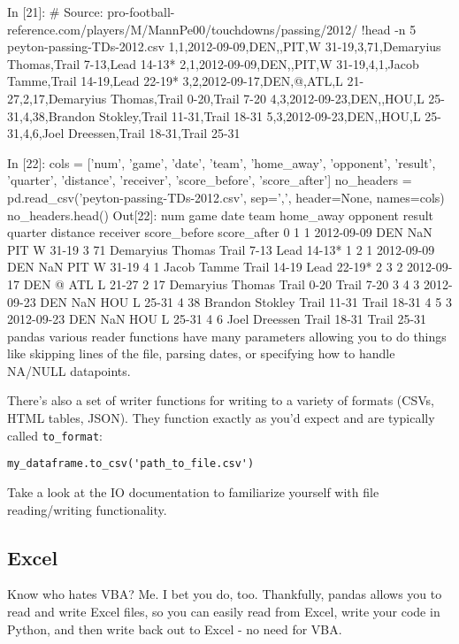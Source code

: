 In [21]:
# Source: pro-football-reference.com/players/M/MannPe00/touchdowns/passing/2012/
!head -n 5 peyton-passing-TDs-2012.csv
1,1,2012-09-09,DEN,,PIT,W 31-19,3,71,Demaryius Thomas,Trail 7-13,Lead 14-13*
2,1,2012-09-09,DEN,,PIT,W 31-19,4,1,Jacob Tamme,Trail 14-19,Lead 22-19*
3,2,2012-09-17,DEN,@,ATL,L 21-27,2,17,Demaryius Thomas,Trail 0-20,Trail 7-20
4,3,2012-09-23,DEN,,HOU,L 25-31,4,38,Brandon Stokley,Trail 11-31,Trail 18-31
5,3,2012-09-23,DEN,,HOU,L 25-31,4,6,Joel Dreessen,Trail 18-31,Trail 25-31

In [22]:
cols = ['num', 'game', 'date', 'team', 'home_away', 'opponent',
        'result', 'quarter', 'distance', 'receiver', 'score_before',
        'score_after']
no_headers = pd.read_csv('peyton-passing-TDs-2012.csv', sep=',', header=None,
                         names=cols)
no_headers.head()
Out[22]:
num	game	date	team	home_away	opponent	result	quarter	distance	receiver	score_before	score_after
0	 1	 1	 2012-09-09	 DEN	 NaN	 PIT	 W 31-19	 3	 71	 Demaryius Thomas	 Trail 7-13	 Lead 14-13*
1	 2	 1	 2012-09-09	 DEN	 NaN	 PIT	 W 31-19	 4	 1	 Jacob Tamme	 Trail 14-19	 Lead 22-19*
2	 3	 2	 2012-09-17	 DEN	 @	 ATL	 L 21-27	 2	 17	 Demaryius Thomas	 Trail 0-20	 Trail 7-20
3	 4	 3	 2012-09-23	 DEN	 NaN	 HOU	 L 25-31	 4	 38	 Brandon Stokley	 Trail 11-31	 Trail 18-31
4	 5	 3	 2012-09-23	 DEN	 NaN	 HOU	 L 25-31	 4	 6	 Joel Dreessen	 Trail 18-31	 Trail 25-31
pandas various reader functions have many parameters allowing you to do things like skipping lines of the file, parsing dates, or specifying how to handle NA/NULL datapoints.

There's also a set of writer functions for writing to a variety of formats (CSVs, HTML tables, JSON). They function exactly as you'd expect and are typically called \texttt{to\_format}:
\begin{framed}
\begin{verbatim}
my_dataframe.to_csv('path_to_file.csv')
\end{verbatim}
\end{framed}
Take a look at the IO documentation to familiarize yourself with file reading/writing functionality.
\subsection{Excel}

Know who hates VBA? Me. I bet you do, too. Thankfully, pandas allows you to read and write Excel files, so you can easily read from Excel, write your code in Python, and then write back out to Excel - no need for VBA.

